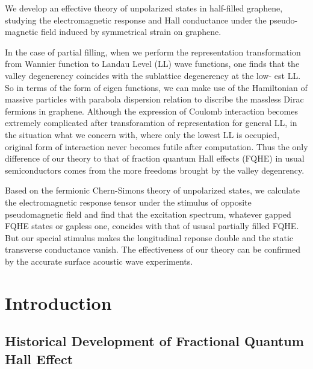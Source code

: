 \documentclass[bachelor,english,numbers]{ustcthesis}
\begin{document}
\begin{enabstract}
	We develop an effective theory of unpolarized states in half-filled graphene, studying the electromagnetic response and Hall conductance under the pseudo-magnetic field induced by symmetrical strain on graphene.\par

	In the case of partial filling, when we perform the representation transformation from Wannier function to Landau Level (LL) wave functions, one finds that the valley degenerency coincides with the sublattice degenerency at the low-
	est LL. So in terms of the form of eigen functions, we can make use of the Hamiltonian of massive particles with parabola dispersion relation to discribe the massless Dirac fermions in graphene. Although the expression of Coulomb interaction becomes extremely complicated after transforamtion of representation for general LL, in the situation what we concern with, where only the lowest LL is occupied, original form of interaction never becomes futile after computation. Thus the only difference of our theory to that of fraction quantum Hall effects (FQHE) in usual semiconductors comes from the more freedoms brought by the valley degenrency.\par

	Based on the fermionic Chern-Simons theory of unpolarized states, we calculate the electromagnetic response tensor under the stimulus of opposite pseudomagnetic field and find that the excitation spectrum, whatever gapped FQHE states or gapless one, concides with that of ususal partially filled FQHE. But our special stimulus makes the longitudinal reponse double and the static transverse conductance vanish. The effectiveness of our theory can be confirmed by the accurate surface acoustic wave experiments.  

\end{enabstract}


\mainmatter
%
%
%
%
\chapter{Introduction}
	\section{Historical Development of Fractional Quantum Hall Effect}
\end{document}

